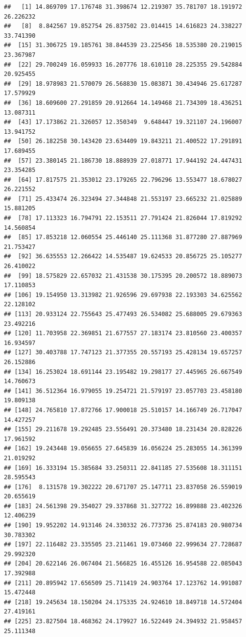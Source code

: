 \documentclass[]{llncs}
\begin{document}
\begin{verbatim}
##   [1] 14.869709 17.176748 31.398674 12.219307 35.781707 18.191972 26.226232
##   [8]  8.842567 19.852754 26.837502 23.014415 14.616823 24.338227 33.741390
##  [15] 31.306725 19.185761 38.844539 23.225456 18.535380 20.219015 23.367987
##  [22] 29.700249 16.059933 16.207776 18.610110 28.225355 29.542884 20.925455
##  [29] 18.978983 21.570079 26.568830 15.083871 30.434946 25.617287 17.579929
##  [36] 18.609600 27.291859 20.912664 14.149468 21.734309 18.436251 13.087311
##  [43] 17.173862 21.326057 12.350349  9.648447 19.321107 24.196007 13.941752
##  [50] 26.182258 30.143420 23.634409 19.843211 21.400522 17.291891 17.689455
##  [57] 23.380145 21.186730 18.888939 27.018771 17.944192 24.447431 23.354285
##  [64] 17.817575 21.353012 23.179265 22.796296 13.553477 18.678027 26.221552
##  [71] 25.433474 26.323494 27.344848 21.553197 23.665232 21.025889 15.881205
##  [78] 17.113323 16.794791 22.153511 27.791424 21.826044 17.819292 14.560854
##  [85] 17.853218 12.060554 25.446140 25.111368 31.877280 27.887969 21.753427
##  [92] 36.635553 12.266422 14.535487 19.624533 20.856725 25.105277 26.410022
##  [99] 18.575829 22.657032 21.431538 30.175395 20.200572 18.889073 17.110853
## [106] 19.154950 13.313982 21.926596 29.697938 22.193303 34.625562 22.128102
## [113] 20.933124 22.755643 25.477493 26.534082 25.688005 29.679363 23.492216
## [120] 11.703958 22.369851 21.677557 27.183174 23.810560 23.400357 16.934597
## [127] 30.403788 17.747123 21.377355 20.557193 25.428134 19.657257 26.152886
## [134] 16.253024 18.691144 23.195482 19.298177 27.445965 26.667549 14.760673
## [141] 36.512364 16.979055 19.254721 21.579197 23.057703 23.458180 19.809138
## [148] 24.765810 17.872766 17.900018 25.510157 14.166749 26.717047 14.427257
## [155] 29.211678 19.292485 23.556491 20.373480 18.231434 20.828226 17.961592
## [162] 19.243448 19.056655 27.645839 16.056224 25.283055 14.361399 21.019292
## [169] 16.333194 15.385684 33.250311 22.841185 27.535608 18.311151 28.595543
## [176]  8.131578 19.302222 20.671707 25.147711 23.837058 26.559019 20.655619
## [183] 24.561398 29.354027 29.337868 31.327722 16.899888 23.402326 12.406239
## [190] 19.952202 14.913146 24.330332 26.773736 25.874183 20.980734 30.783302
## [197] 22.116482 23.335505 23.211461 19.073460 22.999634 27.728687 29.992320
## [204] 20.622146 26.067404 21.566825 16.455126 16.954588 22.085043 17.392988
## [211] 20.895942 17.656509 25.711419 24.903764 17.123762 14.991087 15.472448
## [218] 19.245634 18.150204 24.175335 24.924610 18.849718 14.572404 27.419161
## [225] 23.827504 18.468362 24.179927 16.522449 24.394932 21.958457 25.111348

\end{verbatim}
\end{document}
